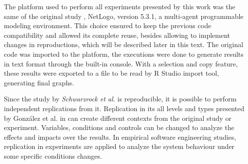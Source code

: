 The platform used to perform all experiments presented by this work was the same of the original study \cite{MAS07}, NetLogo, version 5.3.1, a multi-agent programmable modeling environment. This choice ensured to keep the previous code compatibility and allowed its complete reuse, besides allowing to implement changes in reproductions, which will be described later in this text. The original code was imported to the platform, the executions were done to generate results in text format through the built-in console. With a selection and copy feature, these results were exported to a file to be read by R Studio import tool, generating final graphs.  



Since the study by \textit{Schwarzrock et al.}\cite{MAS07} is reproducible, it is possible to perform independent replications from it. Replication in its all levels and types presented by González et al. in \cite{exp03} can create different contexts from the original study or experiment. Variables, conditions and controls can be changed to analyze the effects and impacts over the results. In empirical software engineering studies, replication in experiments are applied to analyze the system behaviour under some specific conditions changes.
